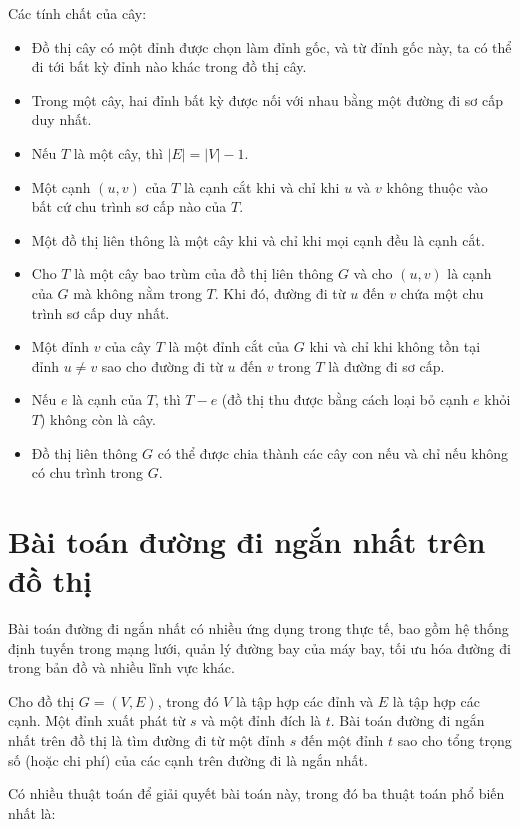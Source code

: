 \documentclass[12pt,oneside,a4paper]{bookAnh1}
\theoremstyle{plain}
\theoremstyle{nonumberplain}
\numberwithin{equation}{chapter}
\begin{document}
{\begin{example}
Các tính chất của cây:
\begin{itemize}
\item Đồ thị cây có một đỉnh được chọn làm đỉnh gốc, và từ đỉnh gốc này, ta có thể đi tới bất kỳ đỉnh nào khác trong đồ thị cây.
    \item Trong một cây, hai đỉnh bất kỳ được nối với nhau bằng một đường đi sơ cấp duy nhất.
    \item Nếu $T$ là một cây, thì $|E| = |V| - 1$.
    \item Một cạnh $(u, v)$ của $T$ là cạnh cắt khi và chỉ khi $u$ và $v$ không thuộc vào bất cứ chu trình sơ cấp nào của $T$.
    \item Một đồ thị liên thông là một cây khi và chỉ khi mọi cạnh đều là cạnh cắt.
    \item Cho $T$ là một cây bao trùm của đồ thị liên thông $G$ và cho $(u, v)$ là cạnh của $G$ mà không nằm trong $T$. Khi đó, đường đi từ $u$ đến $v$ chứa một chu trình sơ cấp duy nhất.
    \item Một đỉnh $v$ của cây $T$ là một đỉnh cắt của $G$ khi và chỉ khi không tồn tại đỉnh $u \neq v$ sao cho đường đi từ $u$ đến $v$ trong $T$ là đường đi sơ cấp.
    \item Nếu $e$ là cạnh của $T$, thì $T - e$ (đồ thị thu được bằng cách loại bỏ cạnh $e$ khỏi $T$) không còn là cây.
    \item Đồ thị liên thông $G$ có thể được chia thành các cây con nếu và chỉ nếu không có chu trình trong $G$.
\end{itemize}
\end{example}
\section{Bài toán đường đi ngắn nhất trên đồ thị}
Bài toán đường đi ngắn nhất có nhiều ứng dụng trong thực tế, bao gồm hệ thống định tuyến trong mạng lưới, quản lý đường bay của máy bay, tối ưu hóa đường đi trong bản đồ và nhiều lĩnh vực khác.
\begin{definition}
Cho đồ thị $G = (V, E)$, trong đó $V$ là tập hợp các đỉnh và $E$ là tập hợp các cạnh. Một đỉnh xuất phát từ $s$ và một đỉnh đích là $t$.
Bài toán đường đi ngắn nhất trên đồ thị là tìm đường đi từ một đỉnh $s$ đến một đỉnh $t$ sao cho tổng trọng số (hoặc chi phí) của các cạnh trên đường đi là ngắn nhất. 
\end{definition}

Có nhiều thuật toán để giải quyết bài toán này, trong đó ba thuật toán phổ biến nhất là:

}
\end{document}
